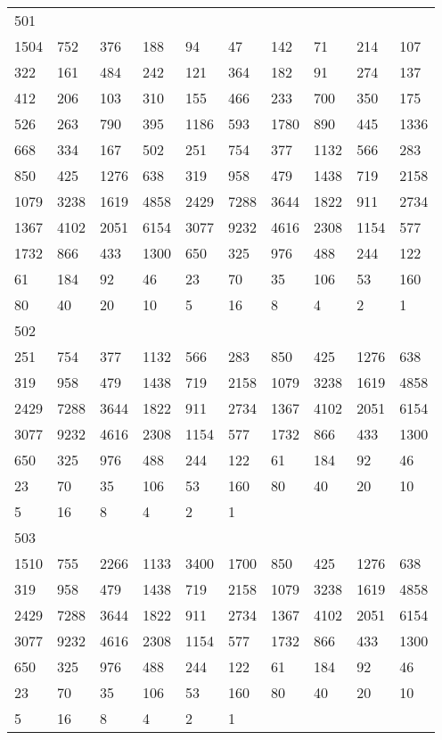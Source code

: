 \begin{longtable}{*{10}{l}}
501&&&&&&&&&\\
1504& 752& 376& 188& 94& 47& 142& 71& 214& 107\\
322& 161& 484& 242& 121& 364& 182& 91& 274& 137\\
412& 206& 103& 310& 155& 466& 233& 700& 350& 175\\
526& 263& 790& 395& 1186& 593& 1780& 890& 445& 1336\\
668& 334& 167& 502& 251& 754& 377& 1132& 566& 283\\
850& 425& 1276& 638& 319& 958& 479& 1438& 719& 2158\\
1079& 3238& 1619& 4858& 2429& 7288& 3644& 1822& 911& 2734\\
1367& 4102& 2051& 6154& 3077& 9232& 4616& 2308& 1154& 577\\
1732& 866& 433& 1300& 650& 325& 976& 488& 244& 122\\
61& 184& 92& 46& 23& 70& 35& 106& 53& 160\\
80& 40& 20& 10& 5& 16& 8& 4& 2& 1\\

502&&&&&&&&&\\
251& 754& 377& 1132& 566& 283& 850& 425& 1276& 638\\
319& 958& 479& 1438& 719& 2158& 1079& 3238& 1619& 4858\\
2429& 7288& 3644& 1822& 911& 2734& 1367& 4102& 2051& 6154\\
3077& 9232& 4616& 2308& 1154& 577& 1732& 866& 433& 1300\\
650& 325& 976& 488& 244& 122& 61& 184& 92& 46\\
23& 70& 35& 106& 53& 160& 80& 40& 20& 10\\
5& 16& 8& 4& 2& 1& \\

503&&&&&&&&&\\
1510& 755& 2266& 1133& 3400& 1700& 850& 425& 1276& 638\\
319& 958& 479& 1438& 719& 2158& 1079& 3238& 1619& 4858\\
2429& 7288& 3644& 1822& 911& 2734& 1367& 4102& 2051& 6154\\
3077& 9232& 4616& 2308& 1154& 577& 1732& 866& 433& 1300\\
650& 325& 976& 488& 244& 122& 61& 184& 92& 46\\
23& 70& 35& 106& 53& 160& 80& 40& 20& 10\\
5& 16& 8& 4& 2& 1& \\


\end{longtable}

